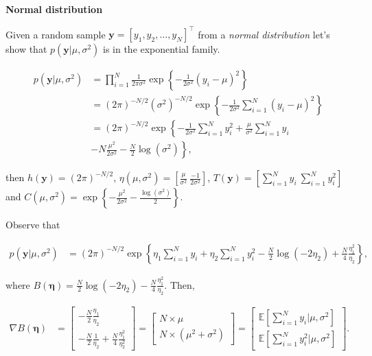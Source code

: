 \begin{enumerate}
\textbf{Normal distribution} 

Given a random sample $\mathbf{y}=[y_1,y_2,\dots,y_N]^{\top}$ from a \textit{normal distribution} let's show that $p(\mathbf{y}|\mu,\sigma^2)$ is in the exponential family.

\begin{align}
	p(\mathbf{y}|\mu,\sigma^2)&=\prod_{i=1}^N \frac{1}{2\pi\sigma^2}\exp\left\{-\frac{1}{2\sigma^2}\left(y_i-\mu\right)^2\right\}\nonumber\\
	&= (2\pi)^{-N/2}(\sigma^2)^{-N/2}\exp\left\{-\frac{1}{2\sigma^2}\sum_{i=1}^N\left(y_i-\mu\right)^2\right\}\nonumber\\
	&= (2\pi)^{-N/2}\exp\left\{-\frac{1}{2\sigma^2}\sum_{i=1}^Ny_i^2+\frac{\mu}{\sigma^2}\sum_{i=1}^N y_i\right.\nonumber\\
	&-\left.N\frac{\mu^2}{2\sigma^2}-\frac{N}{2}\log(\sigma^2)\right\}\nonumber,	
\end{align}

then $h(\mathbf{y})=(2\pi)^{-N/2}$, $\eta(\mu,\sigma^2)=\left[\frac{\mu}{\sigma^2} \ \frac{-1}{2\sigma^2}\right]$, $T(\mathbf{y})=\left[\sum_{i=1}^N y_i \ \sum_{i=1}^N y_i^2\right]$ and $C(\mu,\sigma^2)=\exp\left\{-\frac{\mu^2}{2\sigma^2}-\frac{\log(\sigma^2)}{2}\right\}$.

Observe that 

\begin{align}
	p(\mathbf{y}|\mu,\sigma^2)&= (2\pi)^{-N/2}\exp\left\{\eta_1\sum_{i=1}^N y_i+\eta_2\sum_{i=1}^Ny_i^2-\frac{N}{2}\log(-2\eta_2)+\frac{N}{4}\frac{\eta_1^2}{\eta_2}\right\}\nonumber,
\end{align}

where $B(\bm{\eta})=\frac{N}{2}\log(-2\eta_2)-\frac{N}{4}\frac{\eta_1^2}{\eta_2}$. Then,

\begin{align*}
	\nabla B(\bm{\eta}) & = \begin{bmatrix}
		-\frac{N}{2}\frac{\eta_1}{\eta_2}\\
		-\frac{N}{2}\frac{1}{\eta_2}+\frac{N}{4}\frac{\eta_1^2}{\eta_2^2}
	\end{bmatrix}
	=
	\begin{bmatrix}
		N\times\mu\\
		N\times(\mu^2+\sigma^2)
	\end{bmatrix}  = \begin{bmatrix}
		\mathbb{E}\left[\sum_{i=1}^N y_i\bigr\rvert \mu,\sigma^2\right]\\
		\mathbb{E}\left[\sum_{i=1}^N y_i^2\bigr\rvert \mu,\sigma^2\right]
	\end{bmatrix}. 
\end{align*}
\\


\end{enumerate}
